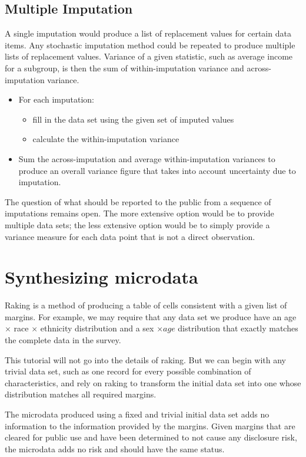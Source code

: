 \documentclass{article}
\def\tighten{ \setlength{\itemsep}{1pt}
    \setlength{\parskip}{0pt}}
\begin{document}
\subsection{Multiple Imputation}
A single imputation would produce a list of replacement
values for certain data items. Any stochastic imputation method could be repeated
to produce multiple lists of replacement values. Variance of a given statistic,
such as average income for a subgroup, is then the sum of within-imputation variance and
across-imputation variance.

\begin{itemize}
\tighten
\item For each imputation:
    \begin{itemize}
\tighten
    \item fill in the data set using the given set of imputed values
    \item calculate the within-imputation variance
    \end{itemize}
\item Sum the across-imputation and average within-imputation variances to
produce an overall variance figure that takes into account uncertainty due to imputation.
\end{itemize}

The question of what should be reported to the public from a sequence of imputations
remains open. The more extensive option would be to provide multiple data sets; the less
extensive option would be to simply provide a variance measure for each data point that
is not a direct observation.




\section{Synthesizing microdata} 
Raking is a method of producing a table of cells consistent with a given list of margins.
For example, we may require that any data set we produce have an age $\times$ race
$\times$ ethnicity distribution and a sex $\times age$ distribution that exactly
matches the complete data in the survey.

This tutorial will not go into the details of raking. But we can begin with any trivial
data set, such as one record for every possible combination of characteristics, and
rely on raking to transform the initial data set into one whose distribution matches
all required margins.

The microdata produced using a fixed and trivial initial data set adds no information to the information provided by the margins.
Given margins that are cleared for public use and have been determined to not cause any
disclosure risk, the microdata adds no risk and should have the same status.
\end{document}
